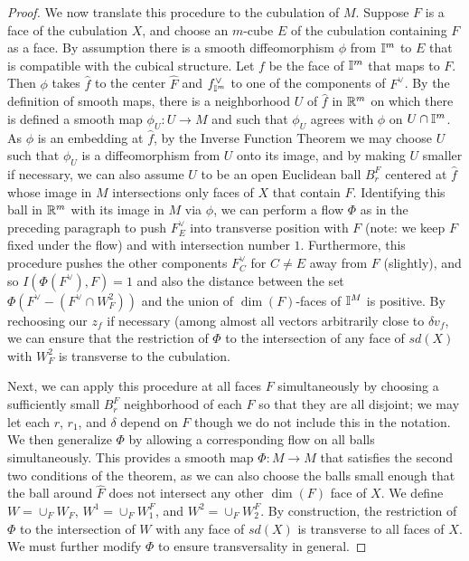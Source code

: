 \begin{proof}
We now translate this procedure to the cubulation of $M$.
Suppose $F$ is a face of the cubulation $X$, and choose an $m$-cube $E$ of the cubulation containing $F$ as a face. By assumption there is a smooth diffeomorphism $\phi$ from $\mathbb{I}^m$ to $E$ that is compatible with the cubical structure. Let $f$ be the face of $\mathbb{I}^m$ that maps to $F$. Then $\phi$ takes $\hat f$ to the center $\hat F$ and $f^\vee_{\mathbb{I}^m}$ to one of the components of $F^\vee$. By the definition of smooth maps, there is a neighborhood $U$ of $\hat f$ in $\mathbb{R}^m$ on which there is defined a smooth map $\phi_U:U\to M$ and such that $\phi_U$ agrees with $\phi$ on $U\cap \mathbb{I}^m$. As $\phi$ is an embedding at $\hat f$, by the Inverse Function Theorem we may choose $U$ such that $\phi_U$ is a diffeomorphism from $U$ onto its image, and by making $U$ smaller if necessary, we can also assume $U$ to be an open Euclidean ball $B^F_r$ centered at $\hat f$ whose image in $M$ intersections only faces of $X$ that contain $F$. Identifying this ball in $\mathbb{R}^m$ with its image in $M$ via $\phi$, we can perform a flow $\Phi$ as in the preceding paragraph to push $F^\vee_E$ into transverse position with $F$ (note: we keep $F$ fixed under the flow) and with intersection number $1$. Furthermore, this procedure pushes the other components $F^\vee_C$ for $C\neq E$ away from $F$ (slightly), and so $I(\Phi(F^\vee),F)=1$ and also  the distance between the set $\Phi(F^\vee-(F^\vee \cap W^2_F))$ and the union of $\dim(F)$-faces of $\mathbb{I}^M$ is positive. By rechoosing our $z_f$ if necessary (among almost all vectors arbitrarily close to $\delta v_f$, we can ensure that the restriction of $\Phi$ to the intersection of any face of $sd(X)$ with $W^2_F$ is transverse to the cubulation.

Next, we can apply this procedure at all faces  $F$ simultaneously by choosing a sufficiently small $B^F_r$  neighborhood of each $\hat F$ so that they are all disjoint; we may let each $r$, $r_1$, and $\delta$ depend on $F$ though we do not include this in the notation. We then generalize $\Phi$ by allowing a corresponding flow on all balls simultaneously. This provides a smooth map $\Phi:M\to M$ that satisfies the second two conditions of the theorem, as we can also choose the balls small enough that the ball around $\hat F$ does not intersect any other $\dim(F)$ face of $X$. We define $W=\cup_F W_F$,  $W^1=\cup_F W^F_1$, and  $W^2=\cup_F W^F_2$.  By construction, the restriction of $\Phi$ to the intersection of $W$ with any face of $sd(X)$ is transverse to all faces of $X$.
We must further modify $\Phi$ to ensure transversality in general.


\end{proof}
